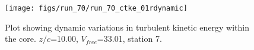 \begin{figure}[H]
\centering
\texttt{[image: figs/run\_70/run\_70\_ctke\_01rdynamic]}
\caption{Plot showing dynamic variations in turbulent kinetic energy within the core. $z/c$=10.00, $V_{free}$=33.01, station 7.}
\label{fig:run_70_ctke_01rdynamic}
\end{figure}


